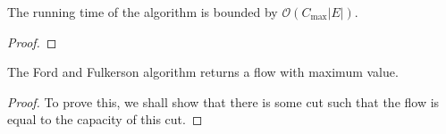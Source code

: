 \begin{lemma}
	The running time of the algorithm is bounded by $\mathcal{O}(C_{\text{max}}|E|)$.
\end{lemma}
\begin{proof}
	
\end{proof}

\begin{lemma}
	The Ford and Fulkerson algorithm returns a flow with maximum value.
\end{lemma}
\begin{proof}
	To prove this, we shall show that there is some cut such that the flow is equal to the capacity of this cut.
\end{proof}